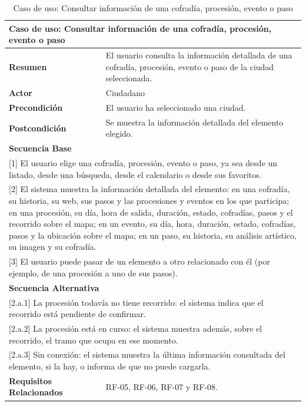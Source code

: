 \begin{table}[h!]
    \begin{tabular}{|p{4cm}|p{11cm}|}
        \hline
        \multicolumn{2}{|l|}{\textbf{Caso de uso: Consultar información de una cofradía, procesión, evento o paso}} \\
        \hline
        \textbf{Resumen} & El usuario consulta la información detallada de una cofradía, procesión, evento o paso de la ciudad seleccionada. \\
        \hline
        \textbf{Actor} & Ciudadano \\
        \hline
        \textbf{Precondición} & El usuario ha seleccionado una ciudad. \\
        \hline
        \textbf{Postcondición} & Se muestra la información detallada del elemento elegido. \\
        \hline
        \multicolumn{2}{|l|}{\textbf{Secuencia Base}} \\
        \hline
        \multicolumn{2}{|p{15cm}|}{ [1] El usuario elige una cofradía, procesión, evento o paso, ya sea desde un listado, desde una búsqueda, desde el calendario o desde sus favoritos. } \\
        \hline
        \multicolumn{2}{|p{15cm}|}{ [2] El sistema muestra la información detallada del elemento: en una cofradía, su historia, su web, sus pasos y las procesiones y eventos en los que participa; en una procesión, su día, hora de salida, duración, estado, cofradías, pasos y el recorrido sobre el mapa; en un evento, su día, hora, duración, estado, cofradías, pasos y la ubicación sobre el mapa; en un paso, su historia, su análisis artístico, su imagen y su cofradía. } \\
        \hline
        \multicolumn{2}{|p{15cm}|}{ [3] El usuario puede pasar de un elemento a otro relacionado con él (por ejemplo, de una procesión a uno de sus pasos). } \\
        \hline
        \multicolumn{2}{|l|}{\textbf{Secuencia Alternativa}} \\
        \hline
        \multicolumn{2}{|p{15cm}|}{ [2.a.1] La procesión todavía no tiene recorrido: el sistema indica que el recorrido está pendiente de confirmar. } \\
        \hline
        \multicolumn{2}{|p{15cm}|}{ [2.a.2] La procesión está en curso: el sistema muestra además, sobre el recorrido, el tramo que ocupa en ese momento. } \\
        \hline
        \multicolumn{2}{|p{15cm}|}{ [2.a.3] Sin conexión: el sistema muestra la última información consultada del elemento, si la hay, o informa de que no puede cargarla. } \\
        \hline
        \textbf{Requisitos Relacionados} & RF-05, RF-06, RF-07 y RF-08. \\
        \hline
    \end{tabular}
    \caption{Caso de uso: Consultar información de una cofradía, procesión, evento o paso}
\end{table}

